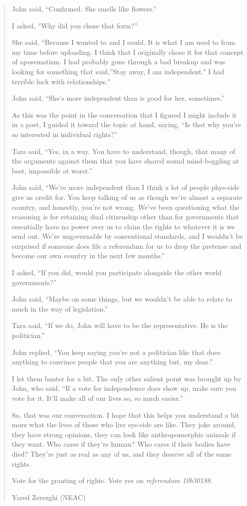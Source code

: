 \begin{quote}
John said, ``Confirmed. She smells like flowers.''

I asked, ``Why did you chose that form?''

She said, ``Because I wanted to and I could. It is what I am used to from my time before uploading. I think that I originally chose it for that concept of aposematism. I had probably gone through a bad breakup and was looking for something that said,''Stay away, I am independent." I had terrible luck with relationships."

John said, ``She's more independent than is good for her, sometimes.''

As this was the point in the conversation that I figured I might include it in a post, I guided it toward the topic at hand, saying, ``Is that why you're so interested in individual rights?''

Tara said, ``Yes, in a way. You have to understand, though, that many of the arguments against them that you have shared sound mind-boggling at best, impossible at worst.''

John said, ``We're more independent than I think a lot of people phys-side give us credit for. You keep talking of us as though we're almost a separate country, and honestly, you're not wrong. We've been questioning what the reasoning is for retaining dual citizenship other than for governments that essentially have no power over us to claim the rights to whatever it is we send out. We're ungovernable by conventional standards, and I wouldn't be surprised if someone does file a referendum for us to drop the pretense and become our own country in the next few months.''

I asked, ``If you did, would you participate alongside the other world governments?''

John said, ``Maybe on some things, but we wouldn't be able to relate to much in the way of legislation.''

Tara said, ``If we do, John will have to be the representative. He is the politician.''

John replied, ``You keep saying you're not a politician like that does anything to convince people that you are anything but, my dear.''

I let them banter for a bit. The only other salient point was brought up by John, who said, ``If a vote for independence does show up, make sure you vote for it. It'll make all of our lives so, so much easier.''

So, that was our conversation. I hope that this helps you understand a bit more what the lives of those who live sys-side are like. They joke around, they have strong opinions, they can look like anthropomorphic animals if they want. Who cares if they're human? Who cares if their bodies have died? They're just as real as any of us, and they deserve all of the same rights.

Vote for the granting of rights. Vote yes on \emph{referendum 10b30188}.

Yared Zerezghi (NEAC)
\end{quote}

